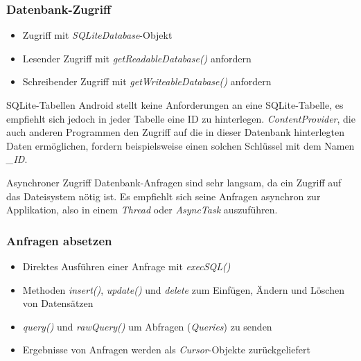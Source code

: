 \begin{frame}
   \frametitle{Datenbank-Zugriff}
   \begin{itemize}
   	\item Zugriff mit \emph{SQLiteDatabase}-Objekt 
   	\item Lesender Zugriff mit \emph{getReadableDatabase()} anfordern
   	\item Schreibender Zugriff mit \emph{getWriteableDatabase()} anfordern
   \end{itemize}

	\begin{alertblock}{SQLite-Tabellen}
		Android stellt keine Anforderungen an eine SQLite-Tabelle, 
		es empfiehlt sich jedoch in jeder Tabelle eine ID zu hinterlegen. 
		\emph{ContentProvider}, die auch anderen Programmen den Zugriff auf die in 
		dieser Datenbank hinterlegten Daten ermöglichen, fordern beispielsweise 
		einen solchen Schlüssel mit dem Namen \emph{\_ID}.
	\end{alertblock}
	
	\begin{alertblock}{Asynchroner Zugriff}
		Datenbank-Anfragen sind sehr langsam, da ein Zugriff auf das Dateisystem 
		nötig ist. Es empfiehlt sich seine Anfragen asynchron zur Applikation, 
		also in einem \emph{Thread} oder \emph{AsyncTask} auszuführen.
	\end{alertblock}  
\end{frame}

\begin{frame}
   \frametitle{Anfragen absetzen}
   \begin{itemize}
   	\item Direktes Ausführen einer Anfrage mit \emph{execSQL()}
   	\item Methoden \emph{insert()}, \emph{update()} und \emph{delete} 
   		zum Einfügen, Ändern und Löschen von Datensätzen
   	\item \emph{query()} und \emph{rawQuery()} um Abfragen (\emph{Queries}) 
			zu senden
   	\item Ergebnisse von Anfragen werden als \emph{Cursor}-Objekte zurückgeliefert
   \end{itemize}
\end{frame}

